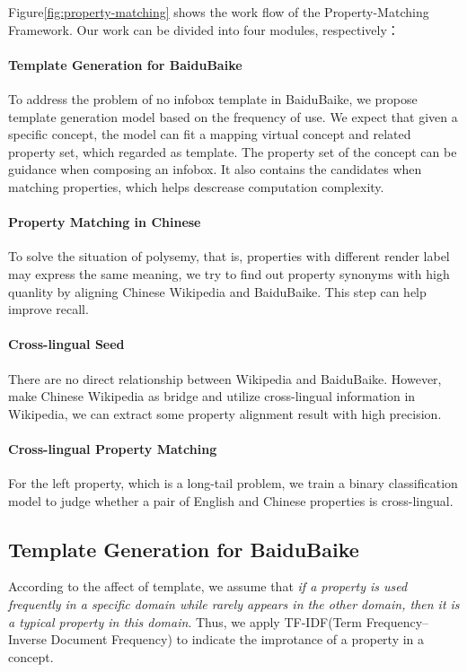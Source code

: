 \documentclass[runningheads,a4paper]{llncs}
\begin{document}
Figure\ref{fig:property-matching} shows the work flow of the Property-Matching Framework. Our work can be divided into four modules, respectively：

\paragraph{Template Generation for BaiduBaike}
To address the problem of no infobox template in BaiduBaike, we propose template generation model based on the frequency of use. We expect that given a specific concept, the model can fit a mapping virtual concept and related property set, which regarded as template. The property set of the concept can be guidance when composing an infobox. It also contains the candidates when matching properties, which helps descrease computation complexity.

\paragraph{Property Matching in Chinese}
To solve the situation of polysemy, that is, properties with different render label may express the same meaning, we try to find out property synonyms with high quanlity by aligning Chinese Wikipedia and BaiduBaike. This step can help improve recall.

\paragraph{Cross-lingual Seed}
There are no direct relationship between Wikipedia and BaiduBaike. However, make Chinese Wikipedia as bridge and utilize cross-lingual information in Wikipedia, we can extract some property alignment result with high precision.

\paragraph{Cross-lingual Property Matching}
For the left property, which is a long-tail problem, we train a binary classification model to judge whether a pair of English and Chinese properties is cross-lingual.

\subsection{Template Generation for BaiduBaike}
According to the affect of template, we assume that \emph{if a property  is used frequently in a specific domain while rarely appears in the other domain, then it is a typical property in this domain}. Thus, we apply TF-IDF(Term Frequency–Inverse Document Frequency) to indicate the improtance of a property in a concept.
\end{document}
